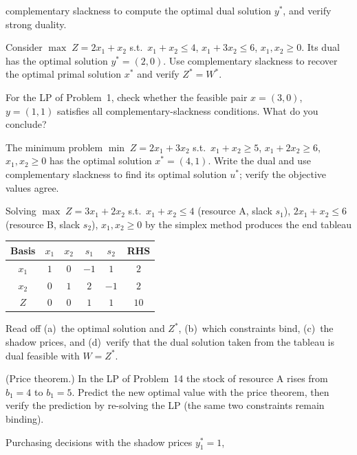 \begin{problems}
        complementary slackness to compute the optimal dual solution
        $y^{*}$, and verify strong duality.
  \item Consider
        $\max\; Z=2x_{1}+x_{2}$ s.t.\ $x_{1}+x_{2}\le 4$,
        $x_{1}+3x_{2}\le 6$, $x_{1},x_{2}\ge 0$.
        Its dual has the optimal solution $y^{*}=(2,0)$. Use complementary
        slackness to recover the optimal primal solution $x^{*}$ and
        verify $Z^{*}=W^{*}$.
  \item For the LP of Problem~1, check whether the feasible pair
        $x=(3,0)$, $y=(1,1)$ satisfies all complementary-slackness
        conditions. What do you conclude?
  \item The minimum problem
        $\min\; Z=2x_{1}+3x_{2}$ s.t.\ $x_{1}+x_{2}\ge 5$,
        $x_{1}+2x_{2}\ge 6$, $x_{1},x_{2}\ge 0$
        has the optimal solution $x^{*}=(4,1)$. Write the dual and use
        complementary slackness to find its optimal solution $u^{*}$;
        verify the objective values agree.
  \item Solving
        $\max\; Z=3x_{1}+2x_{2}$ s.t.\
        $x_{1}+x_{2}\le 4$ (resource A, slack $s_{1}$),
        $2x_{1}+x_{2}\le 6$ (resource B, slack $s_{2}$),
        $x_{1},x_{2}\ge 0$
        by the simplex method produces the end tableau
        \begin{center}
        \begin{tabular}{c|cccc|c}
          Basis & $x_{1}$ & $x_{2}$ & $s_{1}$ & $s_{2}$ & RHS\\
          \hline
          $x_{1}$ & $1$ & $0$ & $-1$ & $1$  & $2$\\
          $x_{2}$ & $0$ & $1$ & $2$  & $-1$ & $2$\\
          \hline
          $Z$     & $0$ & $0$ & $1$  & $1$  & $10$\\
        \end{tabular}
        \end{center}
        Read off (a)~the optimal solution and $Z^{*}$, (b)~which
        constraints bind, (c)~the shadow prices, and (d)~verify that the
        dual solution taken from the tableau is dual feasible with
        $W=Z^{*}$.
  \item (Price theorem.) In the LP of Problem~14 the stock of resource A
        rises from $b_{1}=4$ to $b_{1}=5$. Predict the new optimal value
        with the price theorem, then verify the prediction by re-solving
        the LP (the same two constraints remain binding).
  \item Purchasing decisions with the shadow prices $y_{1}^{*}=1$,

\end{problems}
